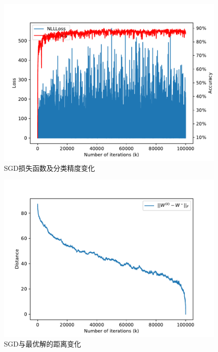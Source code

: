 \documentclass[logo,reportComp]{thesis}
\begin{document}
\begin{minipage}{0.5\linewidth}
\begin{figure}[H]
\centering
\includegraphics[width=\linewidth]{fig/p2-sgd-acc.pdf}
\caption{SGD损失函数及分类精度变化}
\label{fig:p2-acc-sgd}
\end{figure}
\end{minipage}
\begin{minipage}{0.5\linewidth}
\begin{figure}[H]
\centering
\includegraphics[width=0.98\linewidth]{fig/p2-sgd-opt-dist.pdf}
\caption{SGD与最优解的距离变化}
\label{fig:p2-opt-dist-sgd}
\end{figure}
\end{minipage}
\end{document}
